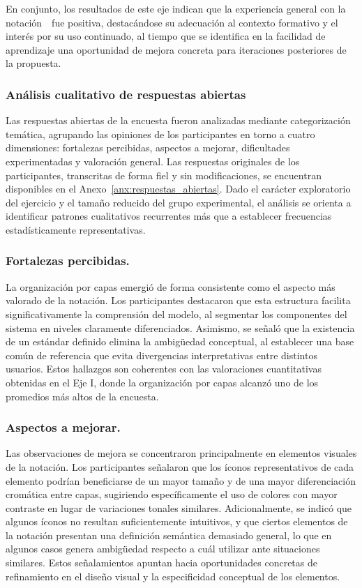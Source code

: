 En conjunto, los resultados de este eje indican que la experiencia general con la notación~\NDITI~fue positiva, destacándose su adecuación al contexto formativo y el interés por su uso continuado, al tiempo que se identifica en la facilidad de aprendizaje una oportunidad de mejora concreta para iteraciones posteriores de la propuesta.


\subsubsection{Análisis cualitativo de respuestas abiertas}

\noindent
Las respuestas abiertas de la encuesta fueron analizadas mediante categorización temática, agrupando las opiniones de los participantes en torno a cuatro dimensiones: fortalezas percibidas, aspectos a mejorar, dificultades experimentadas y valoración general. Las respuestas originales de los participantes, transcritas de forma fiel y sin modificaciones, se encuentran disponibles en el Anexo~\autoref{anx:respuestas_abiertas}. Dado el carácter exploratorio del ejercicio y el tamaño reducido del grupo experimental, el análisis se orienta a identificar patrones cualitativos recurrentes más que a establecer frecuencias estadísticamente representativas.
\subsubsection{Fortalezas percibidas.}
La organización por capas emergió de forma consistente como el aspecto más valorado de la notación. Los participantes destacaron que esta estructura facilita significativamente la comprensión del modelo, al segmentar los componentes del sistema en niveles claramente diferenciados. Asimismo, se señaló que la existencia de un estándar definido elimina la ambigüedad conceptual, al establecer una base común de referencia que evita divergencias interpretativas entre distintos usuarios. Estos hallazgos son coherentes con las valoraciones cuantitativas obtenidas en el Eje I, donde la organización por capas alcanzó uno de los promedios más altos de la encuesta.

\subsubsection{Aspectos a mejorar.}
Las observaciones de mejora se concentraron principalmente en elementos visuales de la notación. Los participantes señalaron que los íconos representativos de cada elemento podrían beneficiarse de un mayor tamaño y de una mayor diferenciación cromática entre capas, sugiriendo específicamente el uso de colores con mayor contraste en lugar de variaciones tonales similares. Adicionalmente, se indicó que algunos íconos no resultan suficientemente intuitivos, y que ciertos elementos de la notación presentan una definición semántica demasiado general, lo que en algunos casos genera ambigüedad respecto a cuál utilizar ante situaciones similares. Estos señalamientos apuntan hacia oportunidades concretas de refinamiento en el diseño visual y la especificidad conceptual de los elementos.


